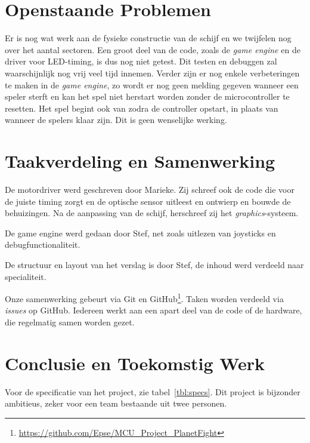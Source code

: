 \documentclass[12pt]{ugentreport}
\begin{document}
\section{Openstaande Problemen}
Er is nog wat werk aan de fysieke constructie van de schijf en we twijfelen nog
over het aantal sectoren. Een groot deel van de code, zoals de \emph{game
  engine} en de driver voor LED-timing, is dus nog niet getest.
Dit testen en debuggen zal waarschijnlijk nog vrij veel tijd innemen.
Verder zijn er nog enkele verbeteringen te maken in de \emph{game engine},
zo wordt er nog geen melding gegeven wanneer een speler sterft en kan het spel
niet herstart worden zonder de microcontroller te resetten.
Het spel begint ook van zodra de controller opstart, in plaats van wanneer de
spelers klaar zijn. Dit is geen wenselijke werking.


\section{Taakverdeling en Samenwerking}
De motordriver werd geschreven door Marieke. Zij schreef ook de code die voor de
juiste timing zorgt en de optische sensor uitleest en ontwierp en bouwde de
behuizingen. Na de aanpassing van de schijf, herschreef zij het \emph{graphics}-systeem.

De game engine werd gedaan door Stef,
net zoals uitlezen van joysticks en debugfunctionaliteit.

De structuur en layout van het verslag is door Stef, de inhoud werd verdeeld
naar specialiteit.

Onze samenwerking gebeurt via Git en
GitHub\footnote{\url{https://github.com/Epse/MCU_Project_PlanetFight}}. Taken worden
verdeeld via \emph{issues} op GitHub. Iedereen werkt aan een apart deel van de
code of de hardware, die regelmatig samen worden gezet.

\section{Conclusie en Toekomstig Werk}
Voor de specificatie van het project, zie tabel~\ref{tbl:specs}.
Dit project is bijzonder ambitieus, zeker voor een team bestaande uit twee
personen.
\end{document}
